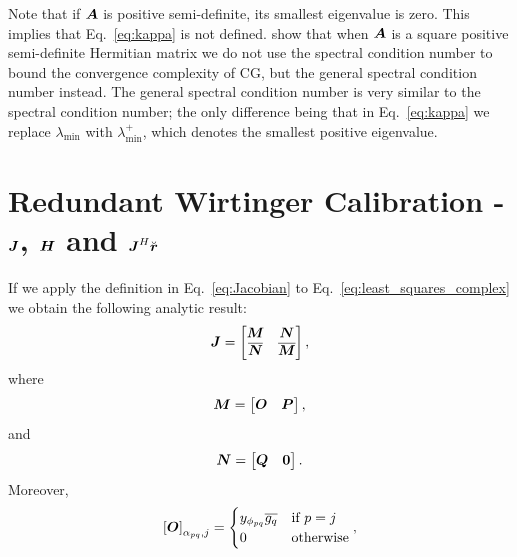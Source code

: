 \documentclass[useAMS,usenatbib]{mn2e}
\newcommand{\bA}{\bmath{A}}
\newcommand{\br}{\bmath{r}}
\newcommand{\bJ}{\bmath{J}}
\newcommand{\bH}{\bmath{H}}
\newcommand{\bN}{\bmath{N}}
\newcommand{\bM}{\bmath{M}}
\newcommand{\bO}{\bmath{O}}
\newcommand{\bP}{\bmath{P}}
\newcommand{\bQ}{\bmath{Q}}
\newcommand{\bzero}{\bmath{0}}
\newcommand{\conj}[1]{\overline{#1}}
\begin{document}
Note that if $\bA$ is positive semi-definite, its smallest eigenvalue is zero. This implies that Eq.~\eqref{eq:kappa} is not defined. \citet{Lu2015} show that when $\bA$
is a square positive semi-definite Hermitian matrix we do not use the spectral condition number to bound the convergence complexity of CG, but the general spectral condition
number instead. The general spectral condition number is very similar to the spectral condition number; the only difference being that in Eq.~\eqref{eq:kappa} we replace  
$\lambda_{\textrm{min}}$ with $\lambda_{\textrm{min}}^+$, which denotes the smallest positive eigenvalue.


\section{Redundant Wirtinger Calibration - $\bJ$, $\bH$ and $\bJ^H\breve{\br}$}
\label{sec:analytic}
If we apply the definition in Eq.~\eqref{eq:Jacobian} to Eq.~\eqref{eq:least_squares_complex} we obtain the following analytic result:
\begin{equation}
\label{eq:Jacobian_red}
\bJ = \begin{bmatrix}
       \bM & \bN\\
       \conj{\bN} & \conj{\bM}
      \end{bmatrix},
\end{equation}
where
\begin{equation}
\bM =\begin{bmatrix}
      \bO & \bP
     \end{bmatrix},
\end{equation}
and 
\begin{equation}
\bN = \begin{bmatrix}
       \bQ & \bzero
      \end{bmatrix}.
\end{equation}
Moreover,
\begin{equation}
\left [ \bO  \right ]_{\alpha_{pq},j} = \begin{cases}
                                         y_{\phi_{pq}}\conj{g_q} & \textrm{if}~p=j\\
                                         0  & \textrm{otherwise} 
                                        \end{cases},
\end{equation}
\end{document}
